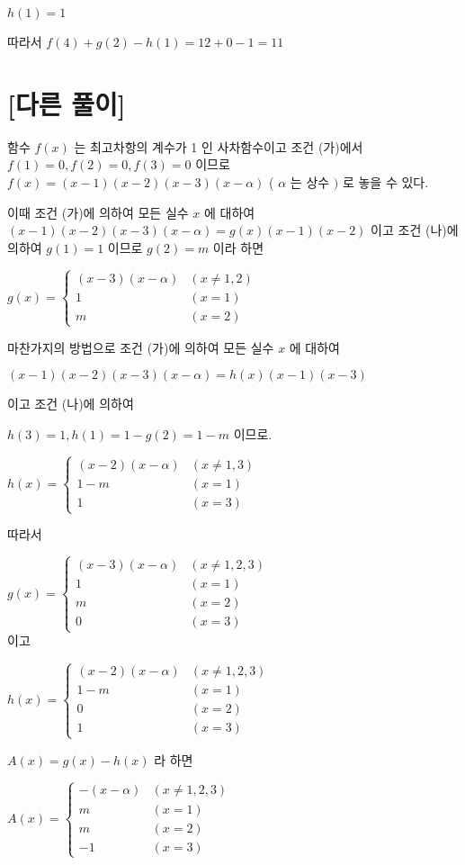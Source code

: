 \documentclass[10pt]{article}
\begin{document}
$h(1)=1$

따라서 $f(4)+g(2)-h(1)=12+0-1=11$

\section*{[다른 풀이]}
함수 $f(x)$ 는 최고차항의 계수가 1 인 사차함수이고 조건 (가)에서 $f(1)=0, f(2)=0, f(3)=0$ 이므로 $f(x)=(x-1)(x-2)(x-3)(x-\alpha)$ ( $\alpha$ 는 상수 $)$ 로 놓을 수 있다.

이때 조건 (가)에 의하여 모든 실수 $x$ 에 대하여 $(x-1)(x-2)(x-3)(x-\alpha)=g(x)(x-1)(x-2)$ 이고 조건 (나)에 의하여 $g(1)=1$ 이므로 $g(2)=m$ 이라 하면

$g(x)= \begin{cases}(x-3)(x-\alpha) & (x \neq 1,2) \\ 1 & (x=1) \\ m & (x=2)\end{cases}$

마찬가지의 방법으로 조건 (가)에 의하여 모든 실수 $x$ 에 대하여

$(x-1)(x-2)(x-3)(x-\alpha)=h(x)(x-1)(x-3)$

이고 조건 (나)에 의하여

$h(3)=1, h(1)=1-g(2)=1-m$ 이므로.

$h(x)= \begin{cases}(x-2)(x-\alpha) & (x \neq 1,3) \\ 1-m & (x=1) \\ 1 & (x=3)\end{cases}$

따라서

$g(x)= \begin{cases}(x-3)(x-\alpha) & (x \neq 1,2,3) \\ 1 & (x=1) \\ m & (x=2) \\ 0 & (x=3)\end{cases}$\\
이고

$h(x)= \begin{cases}(x-2)(x-\alpha) & (x \neq 1,2,3) \\ 1-m & (x=1) \\ 0 & (x=2) \\ 1 & (x=3)\end{cases}$

$A(x)=g(x)-h(x)$ 라 하면

$A(x)= \begin{cases}-(x-\alpha) & (x \neq 1,2,3) \\ m & (x=1) \\ m & (x=2) \\ -1 & (x=3)\end{cases}$
\end{document}
